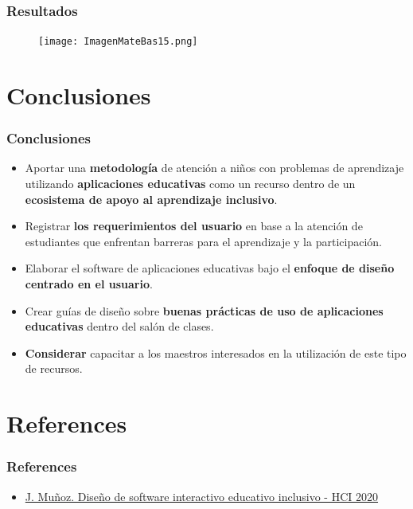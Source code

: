 \documentclass[11pt]{beamer}
\begin{document}
\begin{frame}
\frametitle{Resultados}
    \begin{figure}
    \centering
     \texttt{[image: ImagenMateBas15.png]}
    \end{figure}
\end{frame}

\section{Conclusiones}
\begin{frame}
\frametitle{Conclusiones}
\begin{itemize}
\item Aportar una {\bf metodología} de atención a niños con problemas de aprendizaje utilizando {\bf aplicaciones educativas} como un recurso dentro de un {\bf ecosistema de apoyo al aprendizaje inclusivo}.
\item Registrar {\bf los requerimientos del usuario} en base a la atención de estudiantes que enfrentan barreras para el aprendizaje y la participación.
\item Elaborar el software de aplicaciones educativas bajo el {\bf enfoque de diseño centrado en el usuario}.
\item Crear guías de diseño sobre {\bf buenas prácticas de uso de aplicaciones educativas} dentro del salón de clases.
\item {\bf Considerar} capacitar a los maestros interesados en la utilización de este tipo de recursos.
\end{itemize}
\end{frame}

\section{References}
\begin{frame}
\frametitle{References}
\begin{itemize}
\item \href{https://www.youtube.com/watch?v=F0nOl4GRfC4&t=1577s}{J. Muñoz. Diseño de software interactivo educativo inclusivo - HCI 2020}
\end{itemize}
\end{frame}
\end{document}
